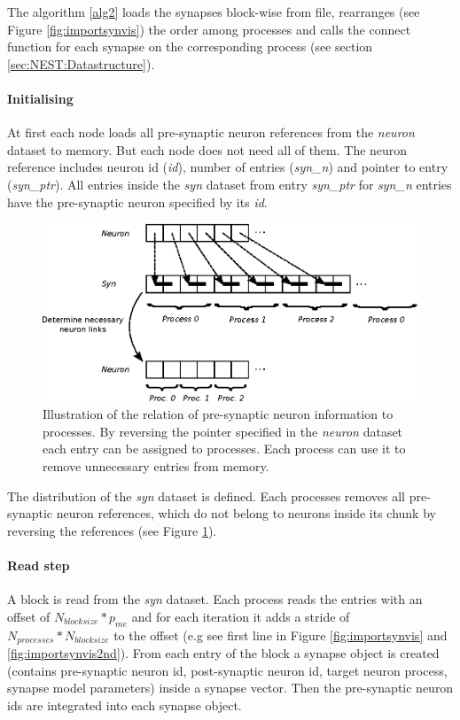 The algorithm \ref{alg2} loads the synapses block-wise from file, rearranges (see Figure \ref{fig:importsynvis}) the order
among processes and calls the connect function for each synapse on the corresponding process (see section \ref{sec:NEST:Datastructure}).

\newpage
\paragraph{Initialising}
At first each node loads all pre-synaptic neuron references from the \emph{neuron} dataset to memory.
But each node does not need all of them. 
The neuron reference includes neuron id (\emph{id}), number of entries  (\emph{syn\_n}) and pointer to entry (\emph{syn\_ptr}).
All entries inside the \emph{syn} dataset from  entry \emph{syn\_ptr} for \emph{syn\_n} entries have the pre-synaptic neuron specified by its \emph{id}.
\begin{figure}[ht!]
\centering
\includegraphics[scale=1.0]{pictures/NeuronLinksRemoving.eps}
\caption{Illustration of the relation of pre-synaptic neuron information to processes.
By reversing the pointer specified in the \emph{neuron} dataset
each entry can be assigned to processes.
Each process can use it to remove unnecessary entries from memory.
}
\label{fig:neuonlinksremoving}
\end{figure}
The distribution of the \emph{syn} dataset is defined.
Each processes removes all pre-synaptic neuron references, which do not belong to
neurons inside its chunk by reversing the references (see Figure \ref{fig:neuonlinksremoving}).

\paragraph{Read step}
A block is read from the \emph{syn} dataset.
Each process reads the entries with an offset of $N_{blocksize} * p_{me}$ and
for each iteration it adds a stride of $N_{processes} * N_{blocksize}$  to the offset (e.g see first line in Figure \ref{fig:importsynvis} and \ref{fig:importsynvis2nd}).
From each entry of the block a synapse object is created
(contains pre-synaptic neuron id, post-synaptic neuron id, target neuron process, synapse model parameters)
inside a synapse vector. Then the pre-synaptic neuron ids are integrated into each synapse object.

